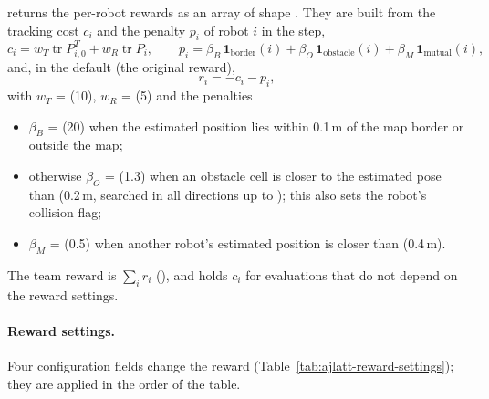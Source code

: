  returns the per-robot rewards as an array of shape
. They are built from the tracking cost $c_i$ and the
penalty $p_i$ of robot $i$ in the step,
\begin{equation}
  c_i = w_T \operatorname{tr} P^T_{i,0} + w_R \operatorname{tr} P_i, \qquad
  p_i = \beta_B\, \mathbf{1}_{\mathrm{border}}(i)
        + \beta_O\, \mathbf{1}_{\mathrm{obstacle}}(i)
        + \beta_M\, \mathbf{1}_{\mathrm{mutual}}(i),
  \label{eq:ajlatt-cost}
\end{equation}
and, in the default  (the original reward),
\begin{equation}
  r_i = -c_i - p_i,
  \label{eq:ajlatt-reward}
\end{equation}
with $w_T$ =  (10), $w_R$ = 
(5) and the penalties
\begin{itemize}
  \item $\beta_B$ =  (20) when the estimated position
        lies within 0.1\,m of the map border or outside the map;
  \item otherwise $\beta_O$ =  (1.3) when an obstacle
        cell is closer to the estimated pose than
         (0.2\,m, searched in all
        directions up to ); this also sets the robot's
        collision flag;
  \item $\beta_M$ =  (0.5) when another
        robot's estimated position is closer than
         (0.4\,m).
\end{itemize}
The team reward is $\sum_i r_i$ (), and
 holds $c_i$ for evaluations that do not depend
on the reward settings.

\paragraph{Reward settings.} Four configuration fields change the reward
(Table~\ref{tab:ajlatt-reward-settings}); they are applied in the order of the
table.

